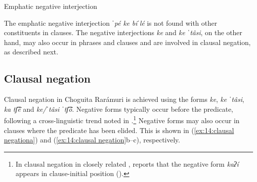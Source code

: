 \ea\label{ex:14:emphatic negative interjection 2}
{Emphatic negative interjection}

    \z
\z

\largerpage
The emphatic negative interjection \textit{ˈpé ke biˈlé} is not found with other constituents in clauses. The negative interjections \textit{ke} and \textit{ke ˈtâsi}, on the other hand, may also occur in phrases and clauses and are involved in clausal negation, as described next.

\subsection{Clausal negation}
\label{subsec: clausal negation}

Clausal negation in Choguita Rarámuri is achieved using the forms \textit{ke}, \textit{ke ˈtâsi}, \textit{ka tʃ͡è} and \textit{ke/ˈtâsi ˈtʃ͡ó}. Negative forms typically occur before the predicate, following a cross-linguistic trend noted in \citep[][105]{dryer2007clause}.\footnote{In clausal negation in closely related , \citet{miller1996guarijio} reports that the negative form \textit{kaʔí} appears in clause-initial position (\citeyear[119]{miller1996guarijio}).} Negative forms may also occur in clauses where the predicate has been elided. This is shown in (\ref{ex:14:clausal negationa}) and (\ref{ex:14:clausal negation}b--c), respectively.

